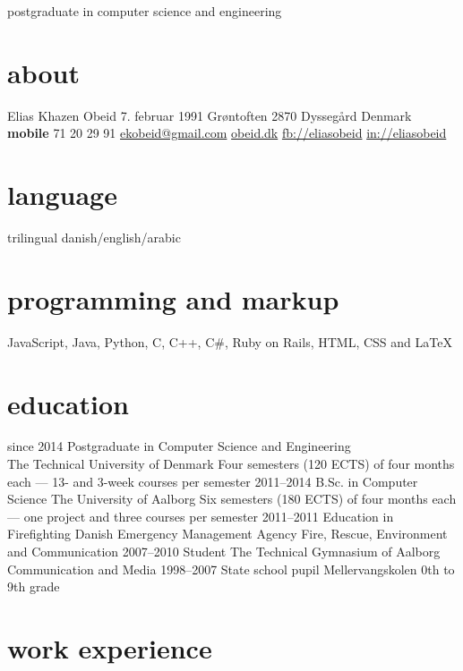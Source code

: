 \documentclass[]{friggeri-cv}
\begin{document}
    {postgraduate in computer science and engineering}

\begin{aside}
  \section{about}
    Elias Khazen Obeid
    7. februar 1991
    Grøntoften 
    2870 Dyssegård
    Denmark
    ~
    \textbf{mobile} 71 20 29 91
    \href{mailto:ekobeid@gmail.com}{ekobeid@gmail.com}
    \href{http://obeid.dk}{obeid.dk}
    \href{http://facebook.com/eliaskhazenobeid}{fb://eliasobeid}
    \href{http://www.linkedin.com/in/eliasobeid}{in://eliasobeid}
  \section{language}
    trilingual danish/english/arabic
  \section{programming and markup}
    JavaScript, Java,
    Python, C, C++, C\#,
    Ruby on Rails,
    HTML, CSS and \LaTeX{}
\end{aside}

\section{education}

\begin{entrylist}
  \entry
    {since 2014}
    {Postgraduate {\normalfont in Computer Science and Engineering}\\}
    {The Technical University of Denmark}
    {Four semesters (120 ECTS) of four months each --- 13- and 3-week courses per semester}
  \entry
    {2011–2014}
    {B.Sc. {\normalfont in Computer Science}}
    {The University of Aalborg}
    {Six semesters (180 ECTS) of four months each --- one project and three courses per semester}
  \entry
    {2011–2011}
    {Education in Firefighting}
    {Danish Emergency Management Agency}
    {Fire, Rescue, Environment and Communication}
  \entry
    {2007–2010}
    {Student}
    {The Technical Gymnasium of Aalborg}
    {Communication and Media}
  \entry
    {1998–2007}
    {State school pupil}
    {Mellervangskolen}
    {0th to 9th grade}
\end{entrylist}

\section{work experience}
\end{document}
